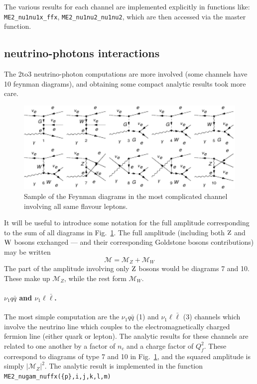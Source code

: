 \documentclass[a4paper,11pt]{article}
\def \beq{\begin{equation}}
\def \eeq{\end{equation}}
\begin{document}
The various results for each channel are implemented explicitly in functions like: \verb|ME2_nu1nu1x_ffx|, \verb|ME2_nu1nu2_nu1nu2|, which are then accessed via the master function.

\subsection{neutrino-photons interactions}
The 2to3 neutrino-photon computations are more involved (some channels have 10 feynman diagrams), and obtaining some compact analytic results took more care.

\begin{figure}[ht]
\includegraphics[width=1.0\textwidth]{Diagrams-crop.pdf}
\caption{Sample of the Feynman diagrams in the most complicated channel involving all same flavour leptons.}
\label{fig:diagrams}
\end{figure}

It will be useful to introduce some notation for the full amplitude corresponding to the sum of all diagrams in Fig.~\ref{fig:diagrams}.
%
The full amplitude (including both ${\mathrm{Z}}$ and ${\mathrm{W}}$ bosons exchanged --- and their corresponding Goldstone bosons contributions) may be written
\beq
\mathcal{M} = \mathcal{M}_Z + \mathcal{M}_W
\eeq
%
The part of the amplitude involving only ${\mathrm{Z}}$ bosons would be diagrams 7 and 10. These make up $\mathcal{M}_Z$, while the rest form $\mathcal{M}_W$.


\paragraph{$\nu_1 q\bar q$ and $\nu_1 \ell \bar \ell$.}
The most simple computation are the $\nu_1 q\bar q$ (1) and $\nu_1 \ell \bar \ell$ (3) channels which involve the neutrino line which couples to the electromagnetically charged fermion line (either quark or lepton). The analytic results for these channels are related to one another by a factor of $n_c$ and a charge factor of $Q_f^2$. These correspond to diagrams of type 7 and 10 in Fig.~\ref{fig:diagrams}, and the squared amplitude is simply $|\mathcal{M}_Z|^2$.
%
The analytic result is implemented in the function \verb|ME2_nugam_nuffx({p},i,j,k,l,m)| 
\end{document}
